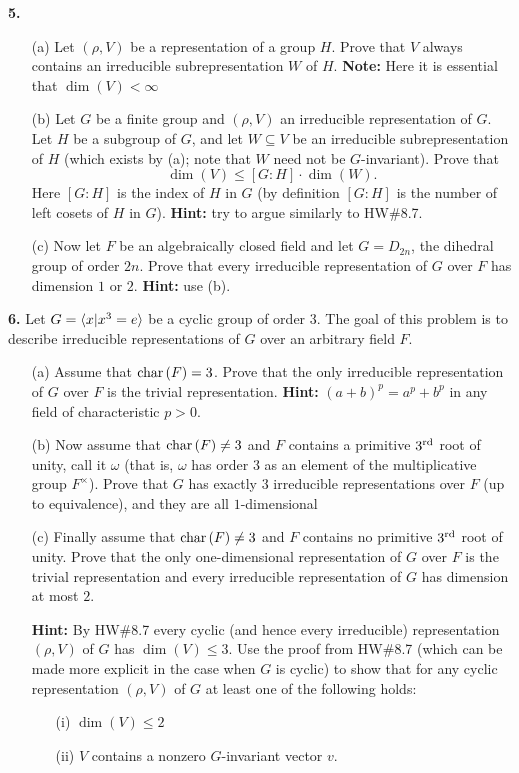 \documentclass[12pt]{amsart}
\begin{document}
\skv
{\bf 5.} %
\begin{itemize}
\item[(a)] Let $(\rho,V)$ be a representation of a group $H$. Prove that $V$ always contains an irreducible subrepresentation $W$
of $H$. {\bf Note:} Here it is essential that $\dim(V)<\infty$ 
\item[(b)] Let $G$ be a finite group and $(\rho,V)$ an irreducible representation of $G$. Let $H$ be a subgroup of $G$, and let $W\subseteq V$
be an irreducible subrepresentation of $H$ (which exists by (a); note that $W$ need not be $G$-invariant). Prove that 
$$\dim(V)\leq [G:H]\cdot\dim(W).$$ Here $[G:H]$ is the index of $H$ in $G$ (by definition $[G:H]$ is the number of left cosets of $H$ in $G$).
{\bf Hint:} try to argue similarly to HW\#8.7.
\item[(c)] Now let $F$ be an algebraically closed field and let $G=D_{2n}$, the dihedral group of order $2n$. Prove that every irreducible representation of $G$ over $F$ has dimension $1$ or $2$. {\bf Hint:} use (b).
\end{itemize}
\skv
{\bf 6.} Let $G={\langle} x| x^3=e{\rangle}$ be a cyclic group of order $3$. The goal of this problem is to describe irreducible representations of $G$
over an arbitrary field $F$.
\begin{itemize}
\item[(a)] Assume that ${\rm char\,}(F)=3$. Prove that the only irreducible representation of $G$ over $F$ is the trivial representation. 
{\bf Hint:} $(a+b)^p=a^p+b^p$ in any field of characteristic $p>0$.
\item[(b)] Now assume that ${\rm char\,}(F)\neq 3$ and $F$ contains a primitive $3^{\rm rd}$ root of unity, call it $\omega$ (that is, $\omega$
has order $3$ as an element of the multiplicative group $F^{\times}$). Prove that $G$ has exactly $3$ irreducible representations over $F$
(up to equivalence), and they are all $1$-dimensional
 \item[(c)] Finally assume that ${\rm char\,}(F)\neq 3$ and $F$ contains no primitive $3^{\rm rd}$ root of unity. Prove that 
 the only one-dimensional representation of $G$ over $F$ is the trivial representation and every irreducible representation of $G$ has dimension at most $2$. 

\skv
{\bf Hint:} By HW\#8.7 every cyclic (and hence every irreducible) representation $(\rho,V)$ of $G$ has $\dim(V)\leq 3$.
Use the proof from HW\#8.7 (which can be made more explicit in the case when $G$ is cyclic) to show that for any cyclic representation
$(\rho,V)$ of $G$ at least one of the following holds:
\begin{itemize}
\item[(i)] $\dim(V)\leq 2$
\item[(ii)] $V$ contains a nonzero $G$-invariant vector $v$.
\end{itemize}
\end{itemize}
\end{document}
